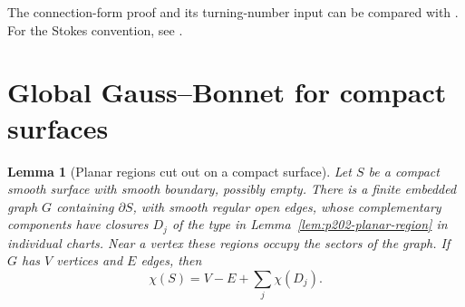 \documentclass[11pt,oneside,openany]{book}
\theoremstyle{plain}
\newtheorem{lemma}[theorem]{Lemma}
\theoremstyle{definition}
\theoremstyle{remark}
\begin{document}
The connection-form proof and its turning-number input can
be compared with \cite[Chapter 9, Theorems 9.1 and 9.3]{LeeRM}.
For the Stokes convention, see \cite[Chapter 10]{P104}.

\section{Global Gauss--Bonnet for compact surfaces}
\label{p202:G26}

\begin{lemma}[Planar regions cut out on a compact surface]
\label{lem:p202-surface-regions}
Let \(S\) be a compact smooth surface with smooth boundary, possibly
empty. There is a finite embedded graph \(G\) containing \(\partial S\),
with smooth regular open edges, whose complementary components have
closures \(D_j\) of the type in Lemma~\ref{lem:p202-planar-region}
in individual charts. Near a vertex these regions occupy the sectors
of the graph. If \(G\) has \(V\) vertices and \(E\) edges, then
\[
 \chi(S)=V-E+\sum_j\chi(D_j).
\]
\end{lemma}
\end{document}
